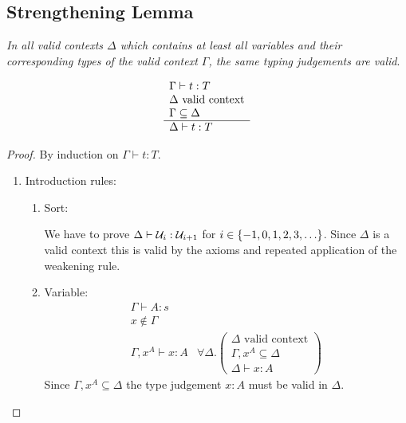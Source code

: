 \subsection{Strengthening Lemma}

\begin{lemma}
    \label{Strengthening}
    \emph{In all valid contexts $\Delta$ which contains at least all variables
    and their corresponding types of the valid context $\Gamma$, the same typing
    judgements are valid}.

    $$
    \begin{array}{l} 
        \Gamma \vdash t : T
        \\
        \Delta \text{ valid context}
        \\
        \Gamma \subseteq \Delta
     \\ \hline 
        \Delta \vdash t: T
    \end{array}
    $$

    \begin{proof} By induction on $\Gamma \vdash t: T$.
        {
            \newcommand{\subgoal}[4] {
                \begin{array}{l}
                    {#1} \text { valid context}
                    \\
                    {#2} \subseteq {#1}
                    \\
                    \hline
                    {#1} \vdash {#3}: {#4}
                \end{array}
            }
            \newcommand{\goal}[4] {
                \forall #1. \left( {\subgoal{#1}{#2}{#3}{#4}} \right)
            }
        \begin{enumerate}
            \item Introduction rules:
            \begin{enumerate}
                \item Sort:

                We have to prove $\Delta \vdash {\cal U}_i : {\cal U}_{i+1}$ for $i \in
                    {\left\{-1, 0, 1, 2, 3, \ldots\right\}}$. Since $\Delta$ is a valid
                    context this is valid by the axioms and repeated application
                    of the weakening rule.

                \item Variable:
                $$
                \begin{array}{l|l}
                    \Gamma \vdash A: s
                    \\
                    x \notin \Gamma
                    \\
                    \hline
                    \Gamma, x^A \vdash x : A
                    &
                    \goal \Delta {\Gamma,x^A} x A
                \end{array}
                $$
                Since $\Gamma,x^A \subseteq \Delta$ the type judgement $x: A$
                    must be valid in $\Delta$.


\end{enumerate}
\end{enumerate}}
\end{proof}
\end{lemma}
